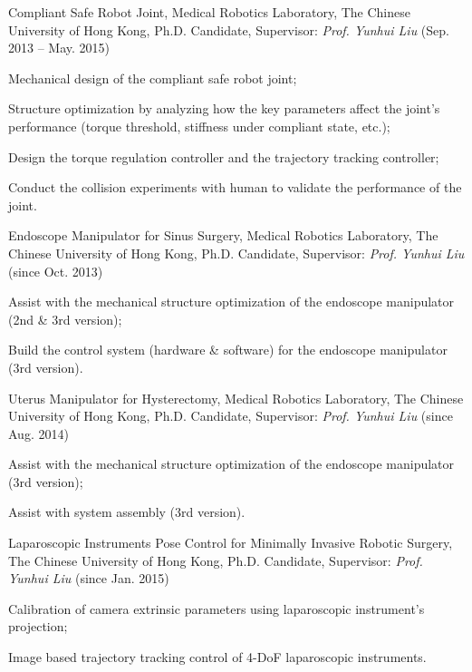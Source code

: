 \documentclass[10pt,letterpaper]{article}
\renewenvironment{itemize}{
  \begin{list}{}{
    \setlength{\leftmargin}{1.5em}
    \setlength{\itemsep}{0.25em}
    \setlength{\parskip}{0pt}
    \setlength{\parsep}{0.25em}
  }
}{
  \end{list}
}
\begin{document}
\begin{itemize}
  \item Compliant Safe Robot Joint, Medical Robotics Laboratory, The Chinese University of Hong Kong, Ph.D. Candidate, Supervisor: \textit{Prof. Yunhui Liu} (Sep. 2013 -- May. 2015)
  \begin{itemize}
    \item Mechanical design of the compliant safe robot joint;
    \item Structure optimization by analyzing how the key parameters affect the joint's performance (torque threshold, stiffness under compliant state, etc.);
    \item Design the torque regulation controller and the trajectory tracking controller;
    \item Conduct the collision experiments with human to validate the performance of the joint.
  \end{itemize}

  \item Endoscope Manipulator for Sinus Surgery, Medical Robotics Laboratory, The Chinese University of Hong Kong, Ph.D. Candidate, Supervisor: \textit{Prof. Yunhui Liu} (since Oct. 2013)
  \begin{itemize}
    \item Assist with the mechanical structure optimization of the endoscope manipulator (2nd \& 3rd version);
    \item Build the control system (hardware \& software) for the endoscope manipulator (3rd version).
  \end{itemize}

  \item Uterus Manipulator for Hysterectomy, Medical Robotics Laboratory, The Chinese University of Hong Kong, Ph.D. Candidate, Supervisor: \textit{Prof. Yunhui Liu} (since Aug. 2014)
  \begin{itemize}
    \item Assist with the mechanical structure optimization of the endoscope manipulator (3rd version);
    \item Assist with system assembly (3rd version).
  \end{itemize}

  \item Laparoscopic Instruments Pose Control for Minimally Invasive Robotic Surgery, The Chinese University of Hong Kong, Ph.D. Candidate, Supervisor: \textit{Prof. Yunhui Liu} (since Jan. 2015)
  \begin{itemize}
    \item Calibration of camera extrinsic parameters using laparoscopic instrument's projection;
    \item Image based trajectory tracking control of 4-DoF laparoscopic instruments.
  \end{itemize}
\end{itemize}
\end{document}
